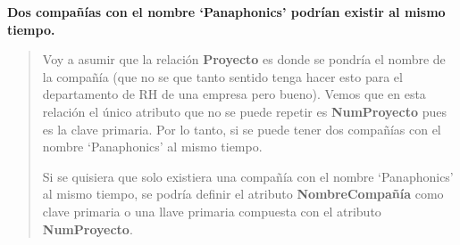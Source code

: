 \textbf{Dos compañías con el nombre ‘Panaphonics’ podrían existir al mismo tiempo.}\vspace{.3cm}

\begin{quote}
    Voy a asumir que la relación \textbf{Proyecto} es donde se pondría el nombre de la compañía (que no se que tanto sentido tenga hacer esto para el departamento de RH de una empresa pero bueno). Vemos que en esta relación el único atributo que no se puede repetir es \textbf{NumProyecto} pues es la clave primaria. Por lo tanto, si se puede tener dos compañías con el nombre ‘Panaphonics’ al mismo tiempo. \vspace{.2cm}

    Si se quisiera que solo existiera una compañía con el nombre ‘Panaphonics’ al mismo tiempo, se podría definir el atributo \textbf{NombreCompañía} como clave primaria o una llave primaria compuesta con el atributo \textbf{NumProyecto}.
\end{quote}
\vspace{.3cm}